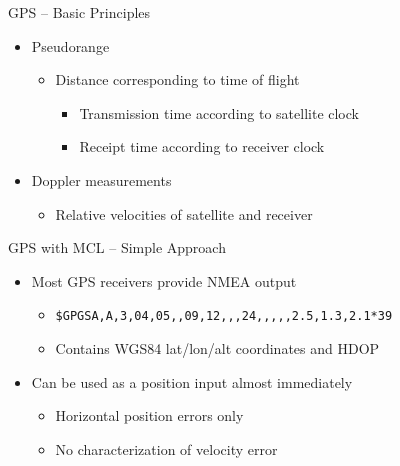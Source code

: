 \documentclass[utf8,12pt]{beamer}
\begin{document}
\begin{frame}{GPS -- Basic Principles}
    \begin{itemize}
        \item Pseudorange
        \begin{itemize}
            \item Distance corresponding to time of flight
            \begin{itemize}
                \item Transmission time according to satellite clock
                \item Receipt time according to receiver clock
            \end{itemize}
        \end{itemize}
        \item Doppler measurements
        \begin{itemize}
            \item Relative velocities of satellite and receiver
        \end{itemize}
    \end{itemize}
\end{frame}

\begin{frame}[fragile]{GPS with MCL -- Simple Approach}
    \begin{itemize}
        \item Most GPS receivers provide NMEA output
        \begin{itemize}
            \item{\footnotesize\verb=$GPGSA,A,3,04,05,,09,12,,,24,,,,,2.5,1.3,2.1*39=}
            \item Contains WGS84 lat/lon/alt coordinates and HDOP
        \end{itemize}
        \item Can be used as a position input almost immediately
        \begin{itemize}
            \item Horizontal position errors only
            \item No characterization of velocity error
        \end{itemize}
    \end{itemize}
\end{frame}
\end{document}

